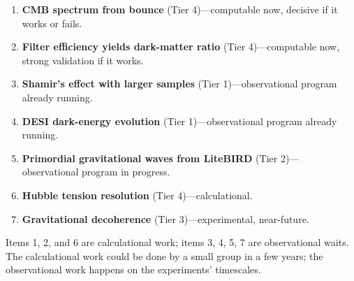 \begin{enumerate}
  \item \textbf{CMB spectrum from bounce} (Tier 4)---computable now, decisive if
    it works or fails.
  \item \textbf{Filter efficiency yields dark-matter ratio} (Tier 4)---computable
    now, strong validation if it works.
  \item \textbf{Shamir's effect with larger samples} (Tier 1)---observational
    program already running.
  \item \textbf{DESI dark-energy evolution} (Tier 1)---observational program
    already running.
  \item \textbf{Primordial gravitational waves from LiteBIRD} (Tier 2)---
    observational program in progress.
  \item \textbf{Hubble tension resolution} (Tier 4)---calculational.
  \item \textbf{Gravitational decoherence} (Tier 3)---experimental, near-future.
\end{enumerate}

Items 1, 2, and 6 are calculational work; items 3, 4, 5, 7 are observational
waits. The calculational work could be done by a small group in a few years; the
observational work happens on the experiments' timescales.
